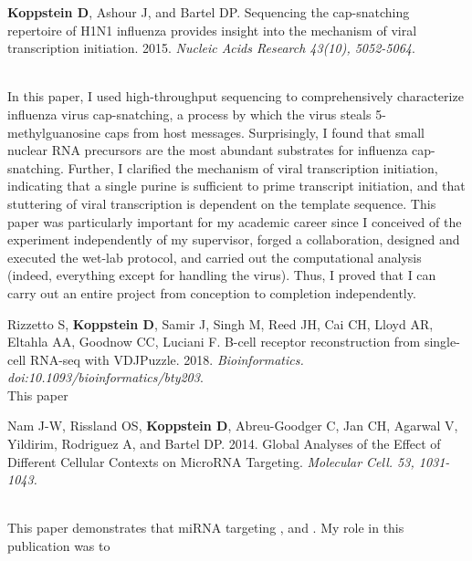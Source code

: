 \documentclass[10pt,a4paper]{article}
\begin{document}
\sloppy  %


{\centering
{}\par
}
\nobreakvspace{0.1em}  %

\vspace{0.05in}

\begin{enumerate}
{\item \textbf{Koppstein D}, Ashour J, and Bartel DP. Sequencing the cap-snatching repertoire of H1N1
influenza provides insight into the mechanism of viral transcription initiation. 2015. \textit{Nucleic Acids Research 43(10), 5052-5064}.} \vspace{0.5em} \\

In this paper, I used high-throughput sequencing to comprehensively characterize influenza virus cap-snatching, a process by which the virus steals 5-methylguanosine caps from host messages. Surprisingly, I found that small nuclear RNA precursors are the most abundant substrates for influenza cap-snatching. Further, I clarified the mechanism of viral transcription initiation, indicating that a single purine is sufficient to prime transcript initiation, and that stuttering of viral transcription is dependent on the template sequence. This paper was particularly important for my academic career since I conceived of the experiment independently of my supervisor, forged a collaboration, designed and executed the wet-lab protocol, and carried out the computational analysis (indeed, everything except for handling the virus). Thus, I proved that I can carry out an entire project from conception to completion independently.

{\item Rizzetto S, \textbf{Koppstein D}, Samir J, Singh M, Reed JH, Cai CH, Lloyd AR, Eltahla AA, Goodnow CC, Luciani F. B-cell receptor reconstruction from single-cell RNA-seq with VDJPuzzle. 2018. \textit{Bioinformatics. doi:10.1093/bioinformatics/bty203}. \vspace{0.5em} \\

This paper

{\item Nam J-W, Rissland OS, \textbf{Koppstein D}, Abreu-Goodger C, Jan CH, Agarwal V, Yildirim, Rodriguez A, and Bartel DP. 2014. Global Analyses of the Effect of Different Cellular Contexts on MicroRNA Targeting. \textit{Molecular Cell. 53, 1031-1043.}} \vspace{0.5em}} \\

This paper demonstrates that miRNA targeting , and . My role in this publication was to

\end{enumerate}

\spacedhrule{-0.4em}{-0.5em}  %
\end{document}
